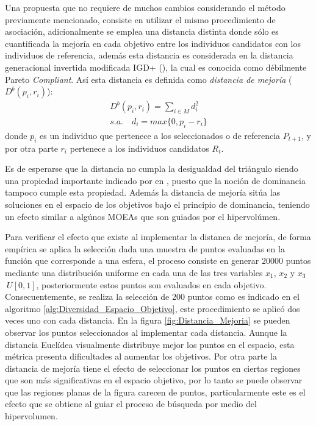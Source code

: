 Una propuesta que no requiere de muchos cambios considerando el método previamente mencionado, consiste en utilizar el mismo procedimiento de asociación, adicionalmente se emplea una distancia distinta donde sólo es cuantificada la mejoría en cada objetivo entre los individuos candidatos con los individuos de referencia, además esta distancia es considerada en la distancia generacional invertida modificada IGD+ (\cite{Joel:IGDPlus_And_GDPlus}), la cual es conocida como débilmente Pareto \textit{Compliant}.
%
Así esta distancia es definida como \textit{distancia de mejoría} ($D^b(p_i, r_i)$):
\begin{equation}
   \begin{split}
	D^b(p_i, r_i) = \sum_{i \in M} d_i^2 \\
	s.a. \quad d_i = max\{0, p_i - r_i\}
   \end{split}
\end{equation}
donde $p_i$ es un individuo que pertenece a los seleccionados o de referencia $P_{t+1}$, y por otra parte $r_i$ pertenece a los individuos candidatos $R_t$.
%

Es de esperarse que la distancia no cumpla la desigualdad del triángulo siendo una propiedad importante indicado por \citeauthor{Joel:HausdorffDistance} en , puesto que la noción de dominancia tampoco cumple esta propiedad.
%
Además la distancia de mejoría sitúa las soluciones en el espacio de los objetivos bajo el principio de dominancia, teniendo un efecto similar a algúnos MOEAs que son guiados por el hipervolúmen.
%

Para verificar el efecto que existe al implementar la distanca de mejoría, de forma empírica se aplica la selección dada una muestra de puntos evaluadas en la función que corresponde a una esfera, el proceso consiste en generar $20000$ puntos mediante una distribución uniforme en cada una de las tres variables $x_1$, $x_2$ y $x_3$ $~U[0,1]$, posteriormente estos puntos son evaluados en cada objetivo.
%
Consecuentemente, se realiza la selección de $200$ puntos como es indicado en el algoritmo \ref{alg:Diversidad_Espacio_Objetivo}, este procedimiento se aplicó dos veces uno con cada distancia.
%
En la figura \ref{fig:Distancia_Mejoria} se pueden observar los puntos seleccionados al implementar cada distancia.
%
Aunque la distancia Euclídea visualmente distribuye mejor los puntos en el espacio, esta métrica presenta dificultades al aumentar los objetivos.
%
Por otra parte la distancia de mejoría tiene el efecto de seleccionar los puntos en ciertas regiones que son más significativas en el espacio objetivo, por lo tanto se puede observar que las regiones planas de la figura carecen de puntos, particularmente este es el efecto que se obtiene al guiar el proceso de búsqueda por medio del hipervolumen.

